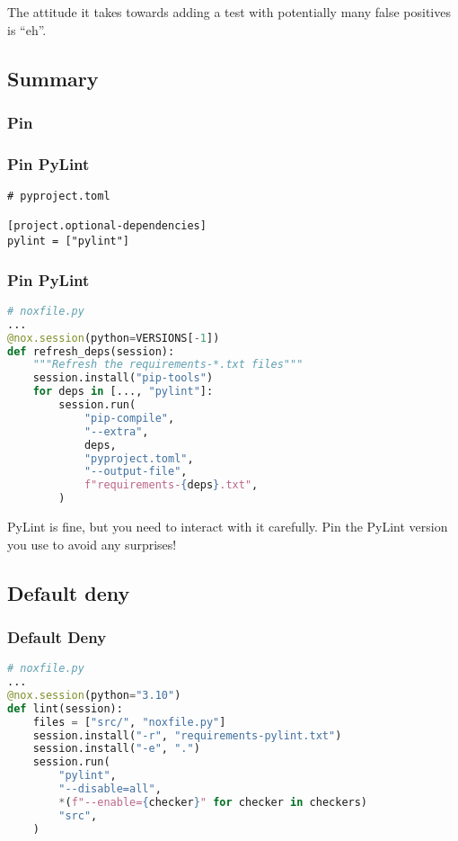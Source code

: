\documentclass[ignorenonframetext]{beamer}
\begin{document}
The attitude it takes towards adding a test with potentially many false
positives is ``eh''.

\hypertarget{summary}{%
\subsection{Summary}\label{summary}}

\hypertarget{pin}{%
\subsubsection{Pin}\label{pin}}

\begin{frame}[fragile]
\frametitle{Pin PyLint}

\begin{lstlisting}
# pyproject.toml

[project.optional-dependencies]
pylint = ["pylint"]
\end{lstlisting}

\end{frame}

\begin{frame}[fragile]
\frametitle{Pin PyLint}

\begin{lstlisting}[language=Python]
# noxfile.py
...
@nox.session(python=VERSIONS[-1])
def refresh_deps(session):
    """Refresh the requirements-*.txt files"""
    session.install("pip-tools")
    for deps in [..., "pylint"]:
        session.run(
            "pip-compile",
            "--extra",
            deps,
            "pyproject.toml",
            "--output-file",
            f"requirements-{deps}.txt",
        )
\end{lstlisting}

\end{frame}

PyLint is fine, but you need to interact with it carefully. Pin the
PyLint version you use to avoid any surprises!

\hypertarget{default-deny}{%
\subsection{Default deny}\label{default-deny}}

\begin{frame}[fragile]
\frametitle{Default Deny}

\begin{lstlisting}[language=Python]
# noxfile.py
...
@nox.session(python="3.10")
def lint(session):
    files = ["src/", "noxfile.py"]
    session.install("-r", "requirements-pylint.txt")
    session.install("-e", ".")
    session.run(
        "pylint",
        "--disable=all",
        *(f"--enable={checker}" for checker in checkers)
        "src",
    )
\end{lstlisting}

\end{frame}
\end{document}
